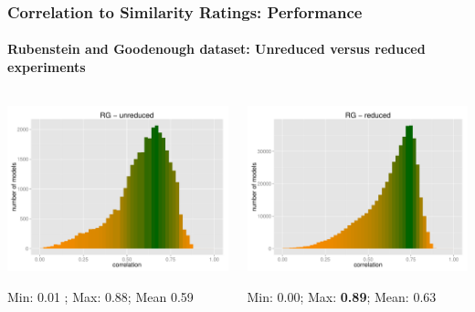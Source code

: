 \documentclass[t]{beamer} %
\begin{document}
\begin{frame}
  \frametitle{Correlation to Similarity Ratings: Performance}
  \framesubtitle{Rubenstein and Goodenough dataset: Unreduced versus reduced experiments}
  \centering
  
  \begin{columns}
    \begin{column}{0.5\textwidth}
      \centering
      \hspace*{-18pt}   \includegraphics[scale=0.30]{img/lapesa_hist_rg_unreduced}
      \begin{block}{}\footnotesize \centering
        Min:  0.01 ; Max:  0.88;  Mean 0.59 
      \end{block}
    \end{column}
    \begin{column}{0.5\textwidth}
      \hspace*{-18pt} 
      \includegraphics[scale=0.30]{img/lapesa_hist_rg_reduced}
      \begin{block}{}\footnotesize \centering
        Min:  0.00; Max: \textbf{0.89};  Mean: 0.63
      \end{block}
    \end{column}
  \end{columns}
 
\end{frame}
\end{document}
